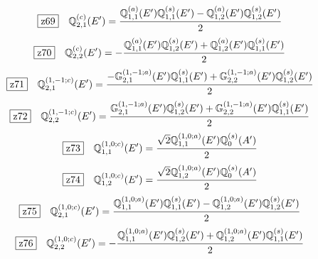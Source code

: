 \documentclass[fleqn,10pt,landscape]{jsarticle}
\begin{document}
\begin{dmath*}
\hspace*{3mm}\fbox{z69}\quad \mathbb{Q}_{2,1}^{(c)}(E^{\prime})=\frac{\mathbb{Q}_{1,1}^{(a)}(E^{\prime}) \mathbb{Q}_{1,1}^{(s)}(E^{\prime}) - \mathbb{Q}_{1,2}^{(a)}(E^{\prime}) \mathbb{Q}_{1,2}^{(s)}(E^{\prime})}{2}
\end{dmath*}
\begin{dmath*}
\hspace*{3mm}\fbox{z70}\quad \mathbb{Q}_{2,2}^{(c)}(E^{\prime})=- \frac{\mathbb{Q}_{1,1}^{(a)}(E^{\prime}) \mathbb{Q}_{1,2}^{(s)}(E^{\prime}) + \mathbb{Q}_{1,2}^{(a)}(E^{\prime}) \mathbb{Q}_{1,1}^{(s)}(E^{\prime})}{2}
\end{dmath*}
\begin{dmath*}
\hspace*{3mm}\fbox{z71}\quad \mathbb{Q}_{2,1}^{(1,-1;c)}(E^{\prime})=\frac{- \mathbb{G}_{2,1}^{(1,-1;a)}(E^{\prime}) \mathbb{Q}_{1,1}^{(s)}(E^{\prime}) + \mathbb{G}_{2,2}^{(1,-1;a)}(E^{\prime}) \mathbb{Q}_{1,2}^{(s)}(E^{\prime})}{2}
\end{dmath*}
\begin{dmath*}
\hspace*{3mm}\fbox{z72}\quad \mathbb{Q}_{2,2}^{(1,-1;c)}(E^{\prime})=\frac{\mathbb{G}_{2,1}^{(1,-1;a)}(E^{\prime}) \mathbb{Q}_{1,2}^{(s)}(E^{\prime}) + \mathbb{G}_{2,2}^{(1,-1;a)}(E^{\prime}) \mathbb{Q}_{1,1}^{(s)}(E^{\prime})}{2}
\end{dmath*}
\begin{dmath*}
\hspace*{3mm}\fbox{z73}\quad \mathbb{Q}_{1,1}^{(1,0;c)}(E^{\prime})=\frac{\sqrt{2} \mathbb{Q}_{1,1}^{(1,0;a)}(E^{\prime}) \mathbb{Q}_{0}^{(s)}(A^{\prime})}{2}
\end{dmath*}
\begin{dmath*}
\hspace*{3mm}\fbox{z74}\quad \mathbb{Q}_{1,2}^{(1,0;c)}(E^{\prime})=\frac{\sqrt{2} \mathbb{Q}_{1,2}^{(1,0;a)}(E^{\prime}) \mathbb{Q}_{0}^{(s)}(A^{\prime})}{2}
\end{dmath*}
\begin{dmath*}
\hspace*{3mm}\fbox{z75}\quad \mathbb{Q}_{2,1}^{(1,0;c)}(E^{\prime})=\frac{\mathbb{Q}_{1,1}^{(1,0;a)}(E^{\prime}) \mathbb{Q}_{1,1}^{(s)}(E^{\prime}) - \mathbb{Q}_{1,2}^{(1,0;a)}(E^{\prime}) \mathbb{Q}_{1,2}^{(s)}(E^{\prime})}{2}
\end{dmath*}
\begin{dmath*}
\hspace*{3mm}\fbox{z76}\quad \mathbb{Q}_{2,2}^{(1,0;c)}(E^{\prime})=- \frac{\mathbb{Q}_{1,1}^{(1,0;a)}(E^{\prime}) \mathbb{Q}_{1,2}^{(s)}(E^{\prime}) + \mathbb{Q}_{1,2}^{(1,0;a)}(E^{\prime}) \mathbb{Q}_{1,1}^{(s)}(E^{\prime})}{2}
\end{dmath*}
\end{document}
